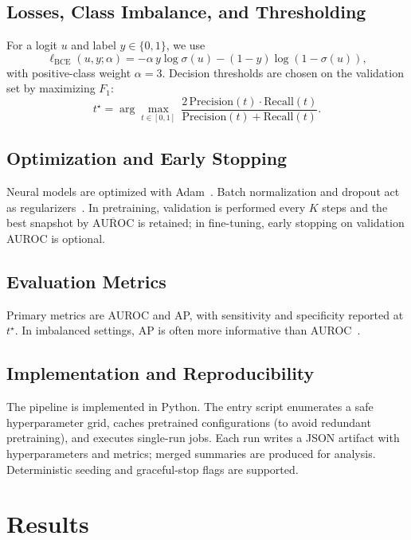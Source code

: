 \documentclass[journal,article,submit,pdftex,moreauthors]{Definitions/mdpi}
\begin{document}
\subsection{Losses, Class Imbalance, and Thresholding}
For a logit $u$ and label $y\in\{0,1\}$, we use
\begin{equation}
\ell_{\mathrm{BCE}}(u,y;\alpha)=-\alpha\,y\log\sigma(u)-(1-y)\log(1-\sigma(u)),
\end{equation}
with positive-class weight $\alpha{=}3$. Decision thresholds are chosen on the validation set by maximizing $F_1$:
\begin{equation}
t^\star=\arg\max_{t\in[0,1]}\ \frac{2\,\mathrm{Precision}(t)\cdot\mathrm{Recall}(t)}{\mathrm{Precision}(t)+\mathrm{Recall}(t)}.
\end{equation}

\subsection{Optimization and Early Stopping}
Neural models are optimized with Adam~\citep{Kingma2015_Adam}. Batch normalization and dropout act as regularizers~\citep{Ioffe2015_BN,Srivastava2014_Dropout}. In pretraining, validation is performed every $K$ steps and the best snapshot by $\overline{\mathrm{AUROC}}$ is retained; in fine-tuning, early stopping on validation AUROC is optional.

\subsection{Evaluation Metrics}
Primary metrics are AUROC and AP, with sensitivity and specificity reported at $t^\star$. In imbalanced settings, AP is often more informative than AUROC~\citep{Saito2015_PR}.

\subsection{Implementation and Reproducibility}
The pipeline is implemented in Python. The entry script enumerates a safe hyperparameter grid, caches pretrained configurations (to avoid redundant pretraining), and executes single-run jobs. Each run writes a JSON artifact with hyperparameters and metrics; merged summaries are produced for analysis. Deterministic seeding and graceful-stop flags are supported.




\section{Results}
\end{document}
